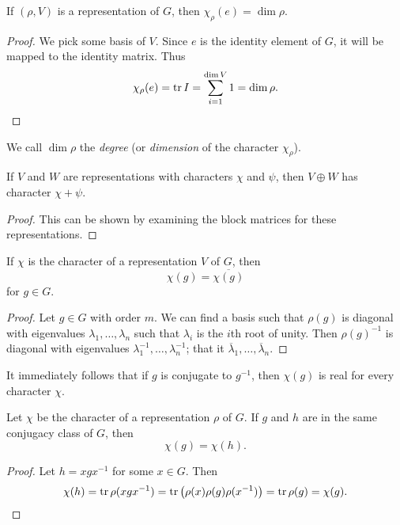 \begin{lemma}
    If $(\rho, V)$ is a representation of $G$, then $\chi_\rho(e) = \dim\rho$.
\end{lemma}

\begin{proof}
    We pick some basis of $V$. Since $e$ is the identity element of $G$, it will be mapped to the identity matrix. Thus
    \[\chi_\rho(e) = \operatorname{tr} I = \sum_{i=1}^{\dim V} 1 = \dim\rho. \]
\end{proof}

We call $\dim\rho$ the \emph{degree} (or \emph{dimension} of the character $\chi_\rho$).

\begin{lemma}
    If $V$ and $W$ are representations with characters $\chi$ and $\psi$, then $V \oplus W$ has character $\chi + \psi$.
\end{lemma}

\begin{proof}
    This can be shown by examining the block matrices for these representations.
\end{proof}

\begin{lemma}
    If $\chi$ is the character of a representation $V$ of $G$, then
    \[ \chi(g) = \overline{\chi(g)} \]
    for $g \in G$.
\end{lemma}

\begin{proof}
    Let $g \in G$ with order $m$. We can find a basis such that $\rho(g)$ is diagonal with eigenvalues $\lambda_1, \ldots, \lambda_n$ such that $\lambda_i$ is the $i$th root of unity. Then $\rho(g)^{-1}$ is diagonal with eigenvalues $\lambda_1^{-1}, \ldots, \lambda_n^{-1}$; that it $\overline\lambda_1, \ldots, \overline\lambda_n$.
\end{proof}

It immediately follows that if $g$ is conjugate to $g^{-1}$, then $\chi(g)$ is real for every character $\chi$.

\begin{lemma}
    Let $\chi$ be the character of a representation $\rho$ of $G$. If $g$ and $h$ are in the same conjugacy class of $G$, then
    \[ \chi(g) = \chi(h). \]
\end{lemma}

\begin{proof}
    Let $h = xgx^{-1}$ for some $x \in G$. Then
    \[ \chi(h) = \operatorname{tr}\rho(xgx^{-1}) = \operatorname{tr}\left(\rho(x)\rho(g)\rho(x^{-1})\right) = \operatorname{tr}\rho(g) = \chi(g). \qedhere \]
\end{proof}

